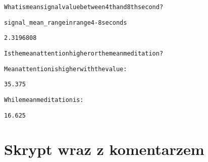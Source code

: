 \documentclass{article}
\begin{document}
\begin{mdframed}
\begin{alltt}
 What is mean signal value between 4th and 8th second?   
 
 signal\_mean\_range in range 4-8 seconds   
 
    2.3196808  
 
    
 
 Is the mean attention higher or the mean meditation?   
 
 Mean attention is higher with the value:   
 
    35.375  
 
 While mean meditation is:   
 
    16.625   
\end{alltt}
\end{mdframed}


\section{Skrypt wraz z komentarzem}

\begin{mdframed}

\end{mdframed}
\end{document}
